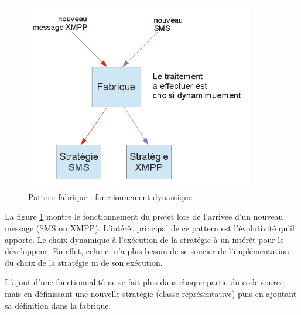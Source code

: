 \begin{figure}[!h]
  \center
  \includegraphics[width=10cm]{img/fonctionnement-strategie-factorie.png}
  \caption{Pattern fabrique : fonctionnement dynamique}
  \label{fonctionnement-strategie-factorie}
\end{figure}

La figure \ref{fonctionnement-strategie-factorie} montre le fonctionnement du projet lors de l'arrivée d'un
nouveau message (SMS ou XMPP).
L'intérêt principal de ce pattern est l'évolutivité qu'il apporte.
Le choix dynamique à l'exécution de la stratégie à un intérêt pour le développeur.
En effet, celui-ci n'a plus besoin de se soucier de l'implémentation du choix de la stratégie ni de son exécution.

L'ajout d'une fonctionnalité ne se fait plus dans chaque partie du code source, mais en définissant une nouvelle stratégie (classe représentative) puis en ajoutant sa définition dans la fabrique.
